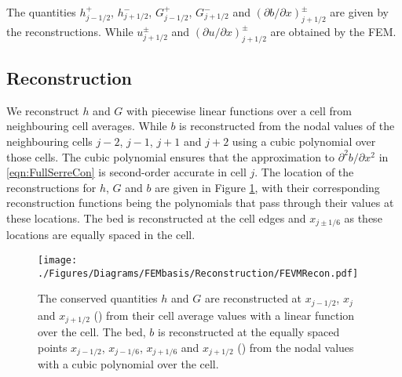 \documentclass[AMA,STIX1COL]{WileyNJD-v2}
\DeclareRobustCommand{\circlet}[1]{\tikz{\draw[#1,thick] (0,0) circle [radius=0.1cm];}}
\DeclareRobustCommand{\crosst}[1]{\tikz{\draw[#1,thick] (0cm,0cm) --
  		(0.1cm,0.1cm) -- (0cm,0.2cm) -- (0.1cm,0.1cm) -- (0.2cm,0.2cm) -- (0.1cm,0.1cm)-- (0.2cm,0cm);}}
\begin{document}
The quantities ${h}^+_{j - 1/2}$, ${h}^-_{j + 1/2}$, $G^+_{j - 1/2}$, $G^-_{j + 1/2}$ and $ \left({\partial {b}}/{\partial x} \right)^\pm_{j + 1/2}$ are given by the reconstructions. While $u^\pm_{j+1/2}$ and $ \left({\partial {u}}/{\partial x} \right)^\pm_{j + 1/2}$ are obtained by the FEM.

\subsection{Reconstruction}
We reconstruct $h$ and $G$ with piecewise linear functions over a cell from neighbouring cell averages. While $b$ is reconstructed from the nodal values of the neighbouring cells $j-2$, $j-1$, $j+1$ and $j+2$ using a cubic polynomial over those cells. The cubic polynomial ensures that the approximation to $\partial^2 b / \partial x^2$ in \eqref{eqn:FullSerreCon} is second-order accurate in cell $j$. The location of the reconstructions for $h$, $G$ and $b$ are given in Figure \ref{fig:ReconLocs}, with their corresponding reconstruction functions being the polynomials that pass through their values at these locations. The bed is reconstructed at the cell edges and $x_{j\pm1/6}$ as these locations are equally spaced in the cell.

\begin{figure}
	\centering
	\texttt{[image: ./Figures/Diagrams/FEMbasis/Reconstruction/FEVMRecon.pdf]}
	\caption{The conserved quantities $h$ and $G$ are reconstructed at $x_{j-1/2}$, $x_j$ and $x_{j+1/2}$ (\circlet{blue}) from their cell average values with a linear function over the cell. The bed, $b$ is reconstructed at the equally spaced points $x_{j-1/2}$, $x_{j-1/6}$, $x_{j+1/6}$ and $x_{j+1/2}$ (\crosst{red}) from the nodal values with a cubic polynomial over the cell.}
	\label{fig:ReconLocs}
\end{figure} 
\end{document}
